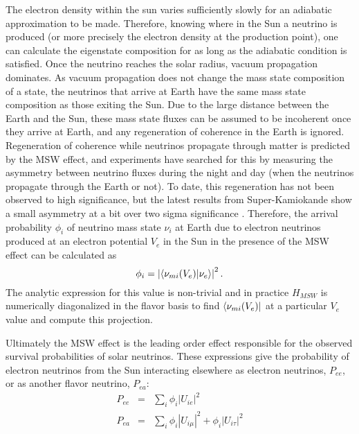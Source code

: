 The electron density within the sun varies sufficiently slowly for an adiabatic approximation to be made.
Therefore, knowing where in the Sun a neutrino is produced (or more precisely the electron density at the production point), one can calculate the eigenstate composition for as long as the adiabatic condition is satisfied.
Once the neutrino reaches the solar radius, vacuum propagation dominates. 
As vacuum propagation does not change the mass state composition of a state, the neutrinos that arrive at Earth have the same mass state composition as those exiting the Sun.
Due to the large distance between the Earth and the Sun, these mass state fluxes can be assumed to be incoherent once they arrive at Earth, and any regeneration of coherence in the Earth is ignored.
Regeneration of coherence while neutrinos propagate through matter is predicted by the MSW effect, and experiments have searched for this by measuring the asymmetry between neutrino fluxes during the night and day (when the neutrinos propagate through the Earth or not).
To date, this regeneration has not been observed to high significance, but the latest results from Super-Kamiokande show a small asymmetry at a bit over two sigma significance \cite{superkiv}.
Therefore, the arrival probability $\phi_i$ of neutrino mass state $\nu_i$ at Earth due to electron neutrinos produced at an electron potential $V_e$ in the Sun in the presence of the MSW effect can be calculated as
\begin{equation}
\phi_i = \left| \braket{\nu_{m i}(V_e)}{\nu_e} \right|^2.
\label{rawflux}
\end{equation}
The analytic expression for this value is non-trivial and in practice $H_{MSW}$ is numerically diagonalized in the flavor basis to find $\bra{\nu_{m i}(V_e)}$ at a particular $V_e$ value and compute this projection.

Ultimately the MSW effect is the leading order effect responsible for the observed survival probabilities of solar neutrinos.
These expressions give the probability of electron neutrinos from the Sun interacting elsewhere as electron neutrinos, $P_{ee}$, or as another flavor neutrino, $P_{ea}$:
\begin{equation}
\begin{array}{rcl}
P_{ee} & = & \sum_i \phi_i |U_{ie}|^2  \\
P_{ea} & = & \sum_i \phi_i |U_{i\mu}|^2 + \phi_i |U_{i\tau}|^2
\end{array}
\label{msw_survive}
\end{equation}

